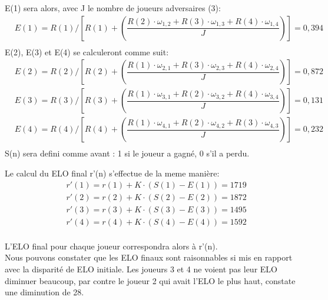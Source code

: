         E(1) sera alors, avec J le nombre de joueurs adversaires (3): 
        \begin{equation}
            \begin{split}
                & E(1) = R(1) / [R(1) + (\dfrac{R(2) \cdot \omega_{1, 2} + R(3) \cdot \omega_{1, 3} + R(4) \cdot \omega_{1, 4}}{J})] = 0,394 \\
            \end{split}
        \end{equation}
        E(2), E(3) et E(4) se calculeront comme suit:
        \begin{equation}
            \begin{split}
                & E(2) = R(2) / [R(2) + (\dfrac{R(1) \cdot \omega_{2, 1} + R(3) \cdot \omega_{2, 3} + R(4) \cdot \omega_{2,4} }{J})] = 0,872 \\
                & E(3) = R(3) / [R(3) + (\dfrac{R(1) \cdot \omega_{3, 1} + R(2) \cdot \omega_{3, 2} + R(4) \cdot \omega_{3,4} }{J})] = 0,131 \\
                & E(4) = R(4) / [R(4) + (\dfrac{R(1) \cdot \omega_{4, 1} + R(2) \cdot \omega_{4, 2} + R(3) \cdot \omega_{4,3} }{J})] = 0,232 \\
            \end{split}
        \end{equation}
        S(n) sera defini comme avant : 1 si le joueur a gagné, 0 s'il a perdu.
        
        Le calcul du ELO final r'(n) s'effectue de la meme manière:
        \begin{equation}
            \begin{split}
                & r'(1) = r(1) + K \cdot (S(1) - E(1)) = 1719 \\
                & r'(2) = r(2) + K \cdot (S(2) - E(2)) = 1872 \\
                & r'(3) = r(3) + K \cdot (S(3) - E(3)) = 1495 \\
                & r'(4) = r(4) + K \cdot (S(4) - E(4)) = 1592 \\
            \end{split}
        \end{equation}

        L'ELO final pour chaque joueur correspondra alors à r'(n). \\
        Nous pouvons constater que les ELO finaux sont raisonnables si mis en rapport avec la disparité de ELO initiale. Les joueurs 3 et
        4 ne voient pas leur ELO diminuer beaucoup, par contre le joueur 2 qui avait l'ELO le plus haut, constate une diminution de 28.
